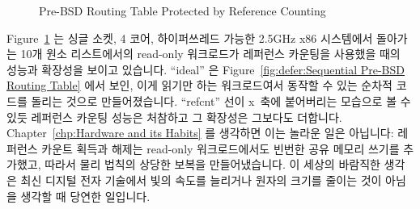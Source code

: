\begin{figure}[tb]
\centering
{}
\caption{Pre-BSD Routing Table Protected by Reference Counting}
\label{fig:defer:Pre-BSD Routing Table Protected by Reference Counting}
\end{figure}

Figure~\ref{fig:defer:Pre-BSD Routing Table Protected by Reference Counting}
는 싱글 소켓, 4 코어, 하이퍼쓰레드 가능한 2.5GHz x86 시스템에서 돌아가는 10개
원소 리스트에서의 read-only 워크로드가 레퍼런스 카운팅을 사용했을 때의 성능과
확장성을 보이고 있습니다.
``ideal'' 은
Figure~\ref{fig:defer:Sequential Pre-BSD Routing Table} 에서 보인, 이게 읽기만
하는 워크로드여서 동작할 수 있는 순차적 코드를
돌리는 것으로 만들어졌습니다.
``refcnt'' 선이 x~축에 붙어버리는 모습으로 볼 수 있듯 레퍼런스 카운팅 성능은
처참하고 그 확장성은 그보다도 더합니다.
Chapter~\ref{chp:Hardware and its Habits} 를 생각하면 이는 놀라운 일은
아닙니다:
레퍼런스 카운트 획득과 해제는 read-only 워크로드에서도 빈번한 공유 메모리
쓰기를 추가했고, 따라서 물리 법칙의 상당한 보복을 만들어냈습니다.
이 세상의 바람직한 생각은 최신 디지털 전자 기술에서 빛의 속도를 늘리거나 원자의
크기를 줄이는 것이 아님을 생각할 때 당연한 일입니다.
\iffalse

